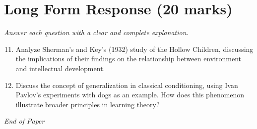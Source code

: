 \documentclass[12pt]{article}
\begin{document}
\section*{Long Form Response (20 marks)}
\textit{Answer each question with a clear and complete explanation.}
\begin{enumerate}[label=\arabic*.]
\setcounter{enumi}{10}
\item Analyze Sherman's and Key's (1932) study of the Hollow Children, discussing the implications of their findings on the relationship between environment and intellectual development.
\item Discuss the concept of generalization in classical conditioning, using Ivan Pavlov's experiments with dogs as an example. How does this phenomenon illustrate broader principles in learning theory?
\end{enumerate}

\vfill
\noindent\textit{End of Paper}
\end{document}
